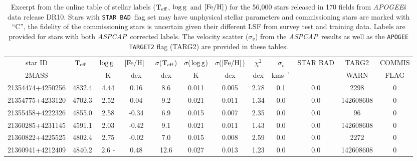 \documentclass[12pt, preprint]{aastex}
\newcommand{\apogee}{\textsl{APOGEE}}
\newcommand{\aspcap}{\textsl{ASPCAP}}
\newcommand{\badstar}{\texttt{STAR BAD}}
\newcommand{\teff}{\mbox{$\rm T_{eff}$}}
\newcommand{\feh}{\mbox{$\rm [Fe/H]$}}
\newcommand{\logg}{\mbox{$\rm \log g$}}
\begin{document}
\begin{table}[!h]
\tiny{
\centering
\caption{Excerpt from the online table of stellar labels (\teff, \logg\ and \feh) for the 56,000 stars released in 170 fields from \apogee\'s data release DR10. Stars with \badstar\ flag set may have unphysical stellar parameters and commissioning stars are marked with ``C'', the fidelity of the commissioning stars is uncertain given their different LSF from survey test and training data. Labels are provided for stars with both \aspcap\ corrected labels. The velocity scatter ($\sigma_v$) from the \aspcap\ results as well as the \texttt{APOGEE TARGET2} flag (TARG2) are provided in these tables.} 
\begin{tabular}{| c | c | c |  c | c | c |  c | c | c | c | c | c | } %
\hline
star ID  & \teff\ & \logg\ & \feh\ & $\sigma$(\teff) & $\sigma$(\logg) & $\sigma$(\feh) & $\chi^2$ & \tiny{$\sigma_{v}$} & \tiny{STAR BAD} & \tiny{TARG2}& \tiny{COMMIS} \\
{2MASS} &  & K &  dex  & dex & K & dex & dex & kms$^{-1}$ & &  \tiny{WARN} & \tiny{ FLAG}  \\    
\hline
\tiny{21354474+4250256} & 4832.4  & 4.44  & 0.16  & 8.6  & 0.011  & 0.005  & 2.78  & 0.1  & 0.0  & 2298 &0 \\
\tiny{21354775+4233120} & 4702.3  & 2.52  & 0.04  & 9.2  & 0.021  & 0.011  & 1.34  & 0.0  & 0.0  & 142608608 & 0 \\
\tiny{21355458+4222326} & 4855.0  & 2.58  & -0.34 &  6.9 &  0.015 &  0.007 &  2.35  & 0.0 &  0.0 &  96 &  0 \\
\tiny{21360285+4231145} & 4591.1  & 2.03  & -0.42 &  9.1 &  0.021 &  0.011 &  1.43  & 0.0 &  0.0 &  142608608 &  0 \\
\tiny{21360822+4225525} & 4802.4  & 2.75  & -0.02 &  7.0 &  0.015 &  0.008 &  2.59  & 0.0 &  0.0 &  2272 &  0 \\
\tiny{21360941+4212409} & 4840.2  & 2.6 - & 0.48  & 12.6 &  0.027 &  0.013 &  1.23  & 0.0 &  0.0 &  142608608 &  0 \\
 \hline
\end{tabular}
\label{tab:online} }
\end{table}  
 
\end{document}
